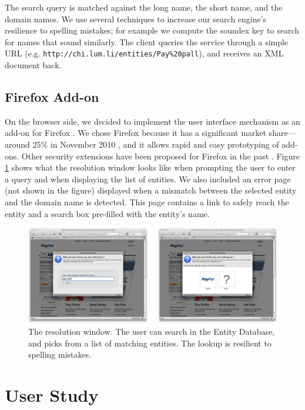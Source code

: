 \documentclass[11pt,styles/chicago,a4paper]{article}
\begin{document}
The search query is matched against the long name, the short name, and the domain names. We use several techniques to increase our search engine's resilience to spelling mistakes; for example we compute the soundex key \cite{knuth1973art} to search for names that sound similarly. The client queries the service through a simple URL (e.g. \texttt{http://chi.lum.li/entities/Pay\%20pall}), and receives an XML document back.

\subsection{Firefox Add-on}

On the browser side, we decided to implement the user interface mechanism as an add-on for Firefox \cite{Firefox}. We chose Firefox because it has a significant market share---around 25\% in November 2010 \cite{statcounter, netapplications}, and it allows rapid and easy prototyping of add-ons. Other security extensions have been proposed for Firefox in the past \cite{samuel2009requestpolicy}. Figure \ref{fig:screenshots} shows what the resolution window looks like when prompting the user to enter a query and when displaying the list of entities. We also included an error page (not shown in the figure) displayed when a mismatch between the selected entity and the domain name is detected. This page contains a link to safely reach the entity and a search box pre-filled with the entity's name.

\begin{figure}[t]
  \includegraphics[width=\textwidth]{figures/screenshots.png}
  \caption{The resolution window. The user can search in the Entity Database, and picks from a list of matching entities. The lookup is resilient to spelling mistakes.}
  \label{fig:screenshots}
\end{figure}

\section{User Study} %
\end{document}

